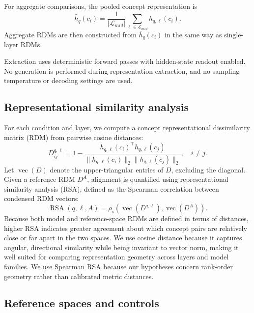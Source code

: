 \documentclass{article}
\begin{document}
For aggregate comparisons, the pooled concept representation is
\begin{equation}
  \bar{h}_{q}(c_i)=\frac{1}{|\mathcal{L}_{mid}|}\sum_{\ell\in\mathcal{L}_{mid}} h_{q,\ell}(c_i).
  \label{eq:appendix_layer_average}
\end{equation}
Aggregate RDMs are then constructed from \(\bar{h}_{q}(c_i)\) in the same way as single-layer RDMs.

Extraction uses deterministic forward passes with hidden-state readout enabled. No generation is performed during representation extraction, and no sampling temperature or decoding settings are used.

\subsection{Representational similarity analysis}

For each condition and layer, we compute a concept representational dissimilarity matrix (RDM) from pairwise cosine distances:
\begin{equation}
  D^{q,\ell}_{ij}=1-\frac{h_{q,\ell}(c_i)^\top h_{q,\ell}(c_j)}
  {\|h_{q,\ell}(c_i)\|_2\|h_{q,\ell}(c_j)\|_2}, \quad i\ne j.
  \label{eq:appendix_cosine_rdm}
\end{equation}
Let \(\operatorname{vec}(D)\) denote the upper-triangular entries of \(D\), excluding the diagonal. Given a reference RDM \(D^A\), alignment is quantified using representational similarity analysis (RSA), defined as the Spearman correlation between condensed RDM vectors:
\begin{equation}
  \operatorname{RSA}(q,\ell,A)=
  \rho_s\left(\operatorname{vec}(D^{q,\ell}), \operatorname{vec}(D^A)\right).
  \label{eq:appendix_rsa}
\end{equation}
Because both model and reference-space RDMs are defined in terms of distances, higher RSA indicates greater agreement about which concept pairs are relatively close or far apart in the two spaces. We use cosine distance because it captures angular, directional similarity while being invariant to vector norm, making it well suited for comparing representation geometry across layers and model families. We use Spearman RSA because our hypotheses concern rank-order geometry rather than calibrated metric distances.

\subsection{Reference spaces and controls}
\end{document}
